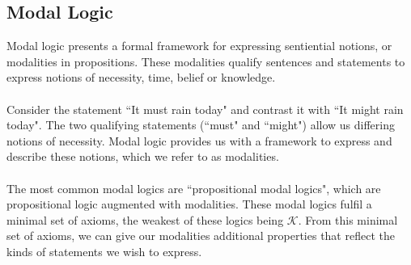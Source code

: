\documentclass[12pt, a4paper, twoside]{article}
\begin{document}
\subsection{Modal Logic}\label{epistemic_modal}
Modal logic presents a formal framework for expressing sentiential notions, or
modalities in propositions.
These modalities qualify sentences and statements to express notions of
necessity, time, belief or knowledge.\\
\\
Consider the statement ``It must rain today" and contrast it with ``It
might rain today".
The two qualifying statements (``must" and ``might") allow us differing notions
of necessity.
Modal logic provides us with a framework to express and describe these
notions, which we refer to as modalities.\\
\\
The most common modal logics are ``propositional modal logics", which are
propositional logic augmented with modalities.
These modal logics fulfil a minimal set of axioms, the weakest of these logics
being $\mathcal{K}$.
From this minimal set of axioms, we can give our modalities additional
properties that reflect the kinds of statements we wish to express.
\end{document}
